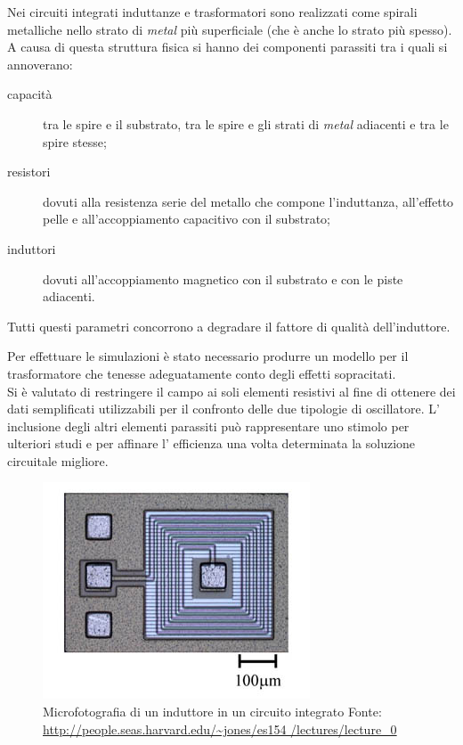 \documentclass[a4paper, 12pt]{memoir}
\begin{document}
Nei circuiti integrati induttanze e trasformatori sono realizzati come
spirali metalliche nello strato di \emph{metal} più superficiale (che è anche
lo strato più spesso).\\
A causa di questa struttura fisica si hanno dei componenti parassiti tra i
quali si annoverano\cite[pp. 431-455]{RazaviRF}:
\begin{description}
\item[capacità] tra le spire e il substrato, tra le spire e gli strati di
	\emph{metal} adiacenti e tra le spire stesse;
\item [resistori] dovuti alla resistenza serie del metallo che compone
	l'induttanza, all'effetto pelle e all'accoppiamento capacitivo con il
	substrato;
\item [induttori] dovuti all'accoppiamento magnetico con il substrato e con le 
	piste adiacenti.
\end{description}
Tutti questi parametri concorrono a degradare il fattore di qualità
dell'induttore.

Per effettuare le simulazioni è stato necessario produrre un modello per il
trasformatore che tenesse adeguatamente conto degli effetti sopracitati.\\
Si è valutato di restringere il campo ai soli elementi resistivi al fine di
ottenere dei dati semplificati utilizzabili per il confronto delle due
tipologie di oscillatore. L' inclusione degli altri elementi parassiti può
rappresentare uno stimolo per ulteriori studi e per affinare l' efficienza una
volta determinata la soluzione circuitale migliore.
\begin{figure}[h]
\centering
\includegraphics[height=0.2\textheight]{images/ic_inductor.JPG}
\caption{Microfotografia di un induttore in un circuito integrato
	\hspace{\textwidth} %
	\footnotesize{Fonte: \url{http://people.seas.harvard.edu/~jones/es154
	/lectures/lecture_0}}}
\end{figure}
\end{document}
